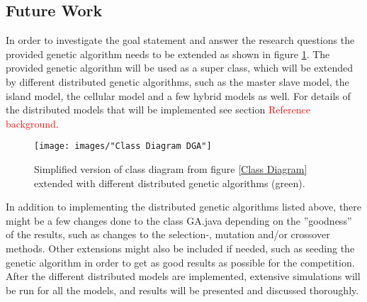 \subsection{Future Work}


In order to investigate the goal statement and answer the research questions the provided genetic algorithm needs to be extended as shown in figure \ref{Class Diagram DGA}. The provided genetic algorithm will be used as a super class, which will be extended by different distributed genetic algorithms, such as the master slave model, the island model, the cellular model and a few hybrid models as well. For details of the distributed models that will be implemented see section \textcolor{red}{Reference background.}\\




\begin{figure}[h!]
\begin{center}
\texttt{[image: images/"Class Diagram DGA"]}
\caption{Simplified version of class diagram from figure \ref{Class Diagram} extended with different distributed genetic algorithms (green).}
\label{Class Diagram DGA}
\end{center}
\end{figure}


\noindent In addition to implementing the distributed genetic algorithms listed above, there might be a few changes done to the class GA.java depending on the ''goodness'' of the results, such as changes to the selection-, mutation and/or crossover methods. Other extensions might also be included if needed, such as seeding the genetic algorithm in order to get as good results as possible for the competition.\\

\noindent After the different distributed models are implemented, extensive simulations will be run for all the models, and results will be presented and discussed thoroughly. 



